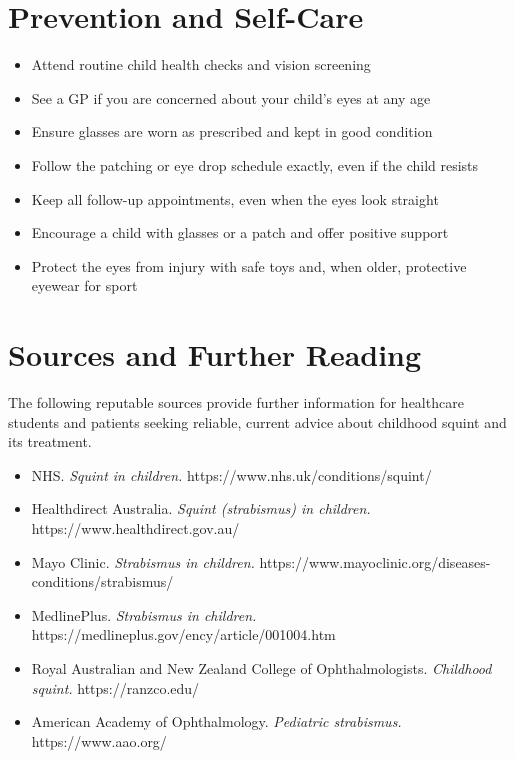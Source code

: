\section*{Prevention and Self-Care}
\begin{itemize}
    \item Attend routine child health checks and vision screening
    \item See a GP if you are concerned about your child's eyes at any age
    \item Ensure glasses are worn as prescribed and kept in good condition
    \item Follow the patching or eye drop schedule exactly, even if the child resists
    \item Keep all follow-up appointments, even when the eyes look straight
    \item Encourage a child with glasses or a patch and offer positive support
    \item Protect the eyes from injury with safe toys and, when older, protective eyewear for sport
\end{itemize}

\section*{Sources and Further Reading}
The following reputable sources provide further information for healthcare students and patients seeking reliable, current advice about childhood squint and its treatment.

\begin{itemize}
    \item NHS. \textit{Squint in children.} https://www.nhs.uk/conditions/squint/
    \item Healthdirect Australia. \textit{Squint (strabismus) in children.} https://www.healthdirect.gov.au/
    \item Mayo Clinic. \textit{Strabismus in children.} https://www.mayoclinic.org/diseases-conditions/strabismus/
    \item MedlinePlus. \textit{Strabismus in children.} https://medlineplus.gov/ency/article/001004.htm
    \item Royal Australian and New Zealand College of Ophthalmologists. \textit{Childhood squint.} https://ranzco.edu/
    \item American Academy of Ophthalmology. \textit{Pediatric strabismus.} https://www.aao.org/
\end{itemize}
